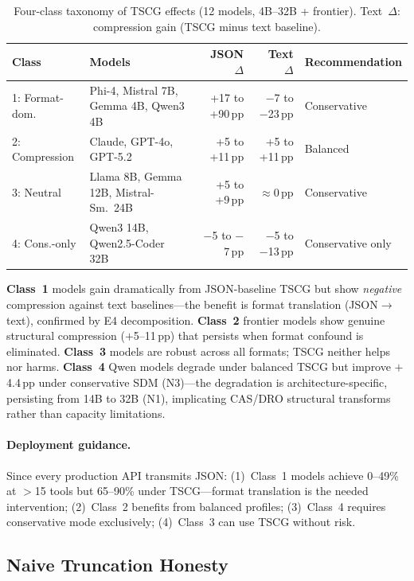 \begin{table}[h]
\centering
\small
\caption{Four-class taxonomy of TSCG effects (12 models, 4B--32B + frontier). Text~$\Delta$: compression gain (TSCG minus text baseline).}
\label{tab:four-class}
\begin{tabular}{llrrl}
\toprule
\textbf{Class} & \textbf{Models} & \textbf{JSON $\Delta$} & \textbf{Text $\Delta$} & \textbf{Recommendation} \\
\midrule
1: Format-dom. & Phi-4, Mistral 7B, Gemma 4B, Qwen3 4B & +17 to +90\,pp & $-$7 to $-$23\,pp & Conservative \\
2: Compression & Claude, GPT-4o, GPT-5.2 & +5 to +11\,pp & +5 to +11\,pp & Balanced \\
3: Neutral & Llama 8B, Gemma 12B, Mistral-Sm.\ 24B & +5 to +9\,pp & $\approx$0\,pp & Conservative \\
4: Cons.-only & Qwen3 14B, Qwen2.5-Coder 32B & $-$5 to $-$7\,pp & $-$5 to $-$13\,pp & Conservative only \\
\bottomrule
\end{tabular}
\end{table}

\textbf{Class~1} models gain dramatically from JSON-baseline TSCG but show \emph{negative} compression against text baselines---the benefit is format translation (JSON$\to$text), confirmed by E4 decomposition.
\textbf{Class~2} frontier models show genuine structural compression ($+$5--11\,pp) that persists when format confound is eliminated.
\textbf{Class~3} models are robust across all formats; TSCG neither helps nor harms.
\textbf{Class~4} Qwen models degrade under balanced TSCG but improve $+$4.4\,pp under conservative SDM (N3)---the degradation is architecture-specific, persisting from 14B to 32B (N1), implicating CAS/DRO structural transforms rather than capacity limitations.

\paragraph{Deployment guidance.} Since every production API transmits JSON: (1)~Class~1 models achieve 0--49\% at $>$15 tools but 65--90\% under TSCG---format translation is the needed intervention; (2)~Class~2 benefits from balanced profiles; (3)~Class~4 requires conservative mode exclusively; (4)~Class~3 can use TSCG without risk.

\subsection{Naive Truncation Honesty}
\label{sec:naive-truncation-discussion}

